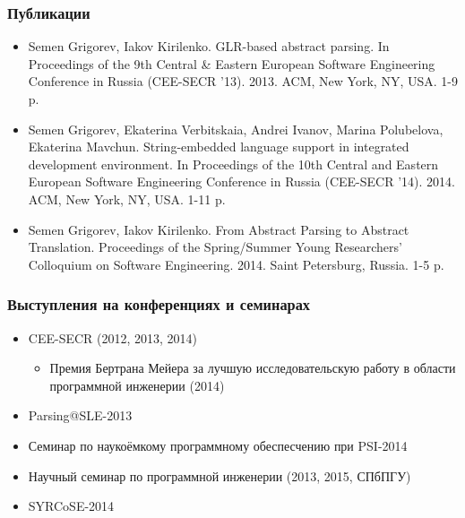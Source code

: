 \documentclass{beamer}
\begin{document}
\begin{frame}
    \transwipe[direction=90]
    \frametitle{Публикации}
  \begin{itemize}
          \item Semen Grigorev, Iakov Kirilenko. GLR-based abstract parsing. In Proceedings of the 9th Central \& Eastern European Software Engineering Conference in Russia (CEE-SECR ’13). 2013. ACM, New York, NY, USA. 1-9 p.
          \item Semen Grigorev, Ekaterina Verbitskaia, Andrei Ivanov, Marina Polubelova, Ekaterina Mavchun. String-embedded language support in integrated development environment. In Proceedings of the 10th Central and Eastern European Software Engineering Conference in Russia (CEE-SECR '14). 2014. ACM, New York, NY, USA. 1-11 p.
          \item Semen Grigorev, Iakov Kirilenko. From Abstract Parsing to Abstract Translation. Proceedings of the Spring/Summer Young Researchers' Colloquium on Software Engineering. 2014. Saint Petersburg, Russia. 1-5 p.
  \end{itemize} 
\end{frame}

\begin{frame}
    \transwipe[direction=90]
    \frametitle{Выступления на конференциях и семинарах}
  \begin{itemize}
          \item CEE-SECR (2012, 2013, 2014)
          \begin{itemize}
              \item Премия Бертрана Мейера за лучшую исследовательскую работу в области программной 
инженерии (2014)
          \end{itemize} 
          \item Parsing@SLE-2013
          \item Семинар по наукоёмкому программному обеспесчению при PSI-2014
          \item Научный семинар по программной инженерии (2013, 2015, СПбПГУ)
          \item SYRCoSE-2014
  \end{itemize} 
\end{frame}
\end{document}
